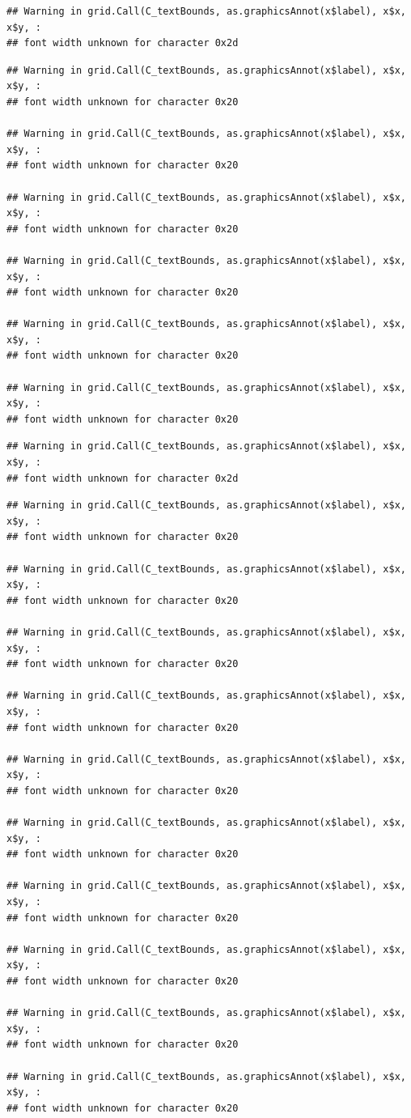 \documentclass[]{article}
\theoremstyle{definition}
\theoremstyle{definition}
\theoremstyle{definition}
\theoremstyle{remark}
\begin{document}
\begin{verbatim}
## Warning in grid.Call(C_textBounds, as.graphicsAnnot(x$label), x$x, x$y, :
## font width unknown for character 0x2d
\end{verbatim}

\begin{verbatim}
## Warning in grid.Call(C_textBounds, as.graphicsAnnot(x$label), x$x, x$y, :
## font width unknown for character 0x20

## Warning in grid.Call(C_textBounds, as.graphicsAnnot(x$label), x$x, x$y, :
## font width unknown for character 0x20

## Warning in grid.Call(C_textBounds, as.graphicsAnnot(x$label), x$x, x$y, :
## font width unknown for character 0x20

## Warning in grid.Call(C_textBounds, as.graphicsAnnot(x$label), x$x, x$y, :
## font width unknown for character 0x20

## Warning in grid.Call(C_textBounds, as.graphicsAnnot(x$label), x$x, x$y, :
## font width unknown for character 0x20

## Warning in grid.Call(C_textBounds, as.graphicsAnnot(x$label), x$x, x$y, :
## font width unknown for character 0x20
\end{verbatim}

\begin{verbatim}
## Warning in grid.Call(C_textBounds, as.graphicsAnnot(x$label), x$x, x$y, :
## font width unknown for character 0x2d
\end{verbatim}

\begin{verbatim}
## Warning in grid.Call(C_textBounds, as.graphicsAnnot(x$label), x$x, x$y, :
## font width unknown for character 0x20

## Warning in grid.Call(C_textBounds, as.graphicsAnnot(x$label), x$x, x$y, :
## font width unknown for character 0x20

## Warning in grid.Call(C_textBounds, as.graphicsAnnot(x$label), x$x, x$y, :
## font width unknown for character 0x20

## Warning in grid.Call(C_textBounds, as.graphicsAnnot(x$label), x$x, x$y, :
## font width unknown for character 0x20

## Warning in grid.Call(C_textBounds, as.graphicsAnnot(x$label), x$x, x$y, :
## font width unknown for character 0x20

## Warning in grid.Call(C_textBounds, as.graphicsAnnot(x$label), x$x, x$y, :
## font width unknown for character 0x20

## Warning in grid.Call(C_textBounds, as.graphicsAnnot(x$label), x$x, x$y, :
## font width unknown for character 0x20

## Warning in grid.Call(C_textBounds, as.graphicsAnnot(x$label), x$x, x$y, :
## font width unknown for character 0x20

## Warning in grid.Call(C_textBounds, as.graphicsAnnot(x$label), x$x, x$y, :
## font width unknown for character 0x20

## Warning in grid.Call(C_textBounds, as.graphicsAnnot(x$label), x$x, x$y, :
## font width unknown for character 0x20
\end{verbatim}
\end{document}
